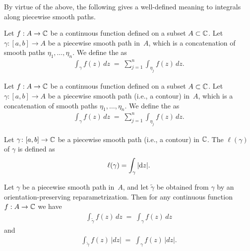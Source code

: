By virtue of the above, the following gives a well-defined meaning
to integrals along piecewise smooth paths.
\begin{definition}
  \label{def:contour_integral}
  Let $f : A \to \mathbb{C}$ be a continuous function defined on a subset $A \subset \mathbb{C}$.
  Let $\gamma \colon [a,b] \to A$ be a piecewise smooth path in~$A$,
  which is a concatenation of smooth paths $\eta_1, \ldots, \eta_n$.
  We define the  as
  \begin{align*}
    \int_\gamma f(z) \, dz \; = \; \sum_{j=1}^n \int_{\eta_j} f(z) \, dz .
  \end{align*}
\end{definition}

\begin{definition}
  \label{def:arc_length_integral}
  Let $f : A \to \mathbb{C}$ be a continuous function defined on a subset $A \subset \mathbb{C}$.
  Let $\gamma \colon [a,b] \to A$ be a piecewise smooth path (i.e., a contour) in~$A$,
  which is a concatenation of smooth paths $\eta_1, \ldots, \eta_n$.
  We define the  as
  \begin{align*}
    \int_\gamma f(z) \, dz \; = \; \sum_{j=1}^n \int_{\eta_j} f(z) \, dz .
  \end{align*}
\end{definition}

\begin{definition}
  \label{def:length}
  Let $\gamma \colon [a,b] \to \mathbb{C}$ be a piecewise smooth path (i.e., a contour)
  in $\mathbb{C}$. The  $\ell(\gamma)$ of $\gamma$ is defined as
  \begin{align*}
    \ell(\gamma) = \int_\gamma |\mathrm{d} z| .
  \end{align*}
\end{definition}

\begin{lemma}
  \label{lem:reparametrization_invariance_of_integral}
  Let $\gamma$ be a piecewise smooth path in~$A$,
  and let $\widetilde{\gamma}$ be obtained from $\gamma$ by an
  orientation-preserving reparametrization. Then for any continuous
  function $f : A \to \mathbb{C}$ we have
  \begin{align*}
    \int_{\widetilde{\gamma}} f(z) \, dz \; = \; \int_{\gamma} f(z) \, dz
  \end{align*}
  and
  \begin{align*}
    \int_{\widetilde{\gamma}} f(z) \, |dz| \; = \; \int_{\gamma} f(z) \, |dz| .
  \end{align*}
\end{lemma}

